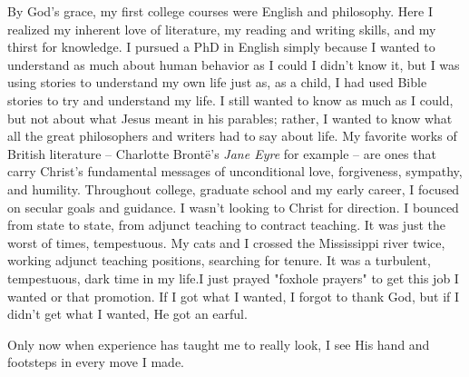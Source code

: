 \documentclass{article}%
\begin{document}
By God's grace, my first college courses were English and philosophy. 
Here I realized my inherent love of literature, my reading and writing skills, and my thirst for knowledge. I pursued a PhD in English simply because I wanted to understand as much about human behavior as I could  
I didn't know it, but I was using stories to understand my own life just as, as a child,  I had used Bible stories to try and  understand my life. I still wanted to know as much as I could, but not about what Jesus meant in his parables; rather, I wanted to know what all the great philosophers and writers had to say about life. 
My favorite works of British literature -- Charlotte Bront\"e's \emph{Jane Eyre} for example -- are ones that carry Christ's fundamental messages of unconditional love, forgiveness, sympathy, and humility. Throughout college, graduate school and my early career, I focused on secular goals and guidance. I wasn't looking to Christ for direction. I bounced from state to state, from adjunct teaching to contract teaching. It was just the worst of times, tempestuous. My cats and I crossed the Mississippi river twice, working adjunct teaching positions, searching for tenure. It was a turbulent, tempestuous, dark time in my life.I just prayed "foxhole prayers" to get this job I wanted or that promotion. If I got what I wanted, I forgot to thank God, but if I didn't get what I wanted, He got an earful.  %

Only now when experience has taught me to really look, I see His hand and footsteps in every move I made. 



\end{document}
